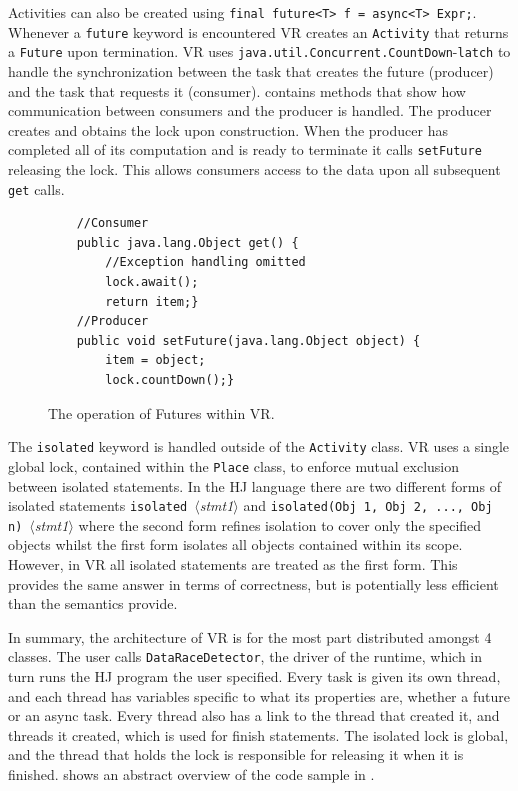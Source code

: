 Activities can also be created using {\tt final future<T> f = async<T> Expr;}. Whenever a \texttt{future} keyword is encountered VR creates an \texttt{Activity} that returns a \texttt{Future} upon termination. VR uses \texttt{java.util.Concurrent.CountDown}-\texttt{latch} to handle the synchronization between the task that creates the future (producer) and the task that requests it (consumer).  contains methods that show how communication between consumers and the producer is handled. The producer creates and obtains the lock upon construction. When the producer has completed all of its computation and is ready to terminate it calls \texttt{setFuture} releasing the lock. This allows consumers access to the data upon all subsequent \texttt{get} calls.

\begin{figure}[t]
\begin{center}
{\small
\begin{verbatim}
	//Consumer    
	public java.lang.Object get() {        
        //Exception handling omitted
        lock.await();
        return item;}
	//Producer 
    public void setFuture(java.lang.Object object) {        
        item = object;
        lock.countDown();}
\end{verbatim}
}
\end{center}
\caption{The operation of Futures within VR.}
\label{fig:futures}
\end{figure} 

The \texttt{isolated} keyword is handled outside of the \texttt{Activity} class. VR uses a single global lock, contained within the \texttt{Place} class, to enforce mutual exclusion between isolated statements. In the HJ language there are two different forms of isolated statements {\tt isolated}~$\langle${\it stmt1}$\rangle$ and {\tt isolated(Obj 1, Obj 2, ..., Obj n)}~$\langle${\it stmt1}$\rangle$ where the second form refines isolation to cover only the specified objects whilst the first form isolates all objects contained within its scope. However, in VR all isolated statements are treated as the first form. This provides the same answer in terms of correctness, but is potentially less efficient than the semantics provide.

In summary, the architecture of VR is for the most part distributed amongst 4 classes. The user calls \texttt{DataRaceDetector}, the driver of the runtime, which in turn runs the HJ program the user specified. Every task is given its own thread, and each thread has variables specific to what its properties are, whether a future or an async task. Every thread also has a link to the thread that created it, and threads it created, which is used for finish statements. The isolated lock is global, and the thread that holds the lock is responsible for releasing it when it is finished.  shows an abstract overview of the code sample in .

